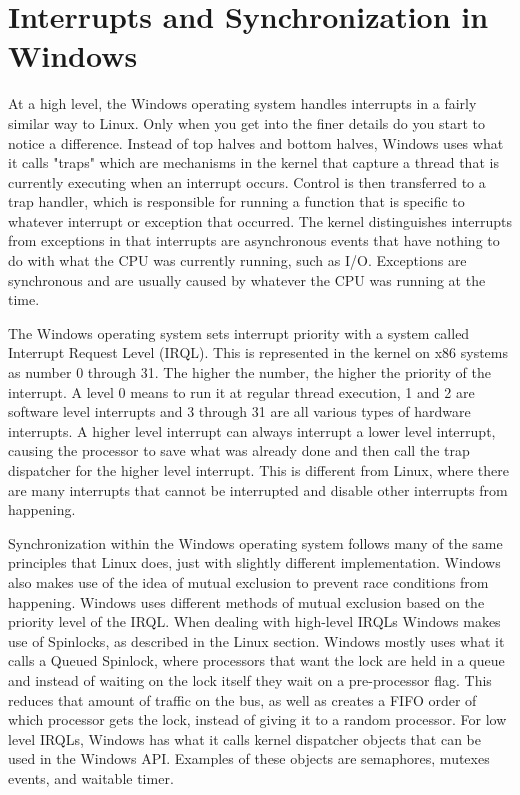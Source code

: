 \documentclass[10pt,serif,draftclsnofoot,onecolumn]{IEEEtran}
\begin{document}
	\section{Interrupts and Synchronization in Windows}
	\par
			At a high level, the Windows operating system handles interrupts in a fairly similar way to Linux. Only when you get into the finer details do you start to notice a difference. Instead of top halves and bottom halves, Windows uses what it calls "traps" which are mechanisms in the kernel that capture a thread that is currently executing when an interrupt occurs. Control is then transferred to a trap handler, which is responsible for running a function that is specific to whatever interrupt or exception that occurred\cite{5}. The kernel distinguishes interrupts from exceptions in that interrupts are asynchronous events that have nothing to do with what the CPU was currently running, such as I/O. Exceptions are synchronous and are usually caused by whatever the CPU was running at the time.
	\newline
	\par
			The Windows operating system sets interrupt priority with a system called Interrupt Request Level (IRQL). This is represented in the kernel on x86 systems as number 0 through 31. The higher the number, the higher the priority of the interrupt. A level 0 means to run it at regular thread execution, 1 and 2 are software level interrupts and 3 through 31 are all various types of hardware interrupts\cite{5}. A higher level interrupt can always interrupt a lower level interrupt, causing the processor to save what was already done and then call the trap dispatcher for the higher level interrupt. This is different from Linux, where there are many interrupts that cannot be interrupted and disable other interrupts from happening.
	\newline
	\par
			Synchronization within the Windows operating system follows many of the same principles that Linux does, just with slightly different implementation. Windows also makes use of the idea of mutual exclusion to prevent race conditions from happening. Windows uses different methods of mutual exclusion based on the priority level of the IRQL. When dealing with high-level IRQLs Windows makes use of Spinlocks, as described in the Linux section. Windows mostly uses what it calls a Queued Spinlock, where processors that want the lock are held in a queue and instead of waiting on the lock itself they wait on a pre-processor flag\cite{5}. This reduces that amount of traffic on the bus, as well as creates a FIFO order of which processor gets the lock, instead of giving it to a random processor. For low level IRQLs, Windows has what it calls kernel dispatcher objects that can be used in the Windows API. Examples of these objects are semaphores, mutexes events, and waitable timer\cite{5}.		
\end{document}
